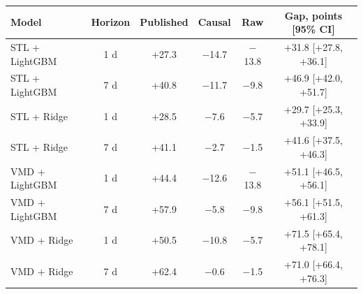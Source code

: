 \renewcommand{\arraystretch}{1.25}
\footnotesize
\begin{tabular}{|l|c|c|c|c|c|}
\hline
\textbf{Model} & \textbf{Horizon} & \textbf{Published} & \textbf{Causal} & \textbf{Raw} & \textbf{Gap, points [95\% CI]} \\
\hline
STL + LightGBM & 1 d & +27.3 & $-$14.7 & $-$13.8 & +31.8 [+27.8, +36.1] \\
\hline
STL + LightGBM & 7 d & +40.8 & $-$11.7 & $-$9.8 & +46.9 [+42.0, +51.7] \\
\hline
STL + Ridge & 1 d & +28.5 & $-$7.6 & $-$5.7 & +29.7 [+25.3, +33.9] \\
\hline
STL + Ridge & 7 d & +41.1 & $-$2.7 & $-$1.5 & +41.6 [+37.5, +46.3] \\
\hline
VMD + LightGBM & 1 d & +44.4 & $-$12.6 & $-$13.8 & +51.1 [+46.5, +56.1] \\
\hline
VMD + LightGBM & 7 d & +57.9 & $-$5.8 & $-$9.8 & +56.1 [+51.5, +61.3] \\
\hline
VMD + Ridge & 1 d & +50.5 & $-$10.8 & $-$5.7 & +71.5 [+65.4, +78.1] \\
\hline
VMD + Ridge & 7 d & +62.4 & $-$0.6 & $-$1.5 & +71.0 [+66.4, +76.3] \\
\hline
\end{tabular}
